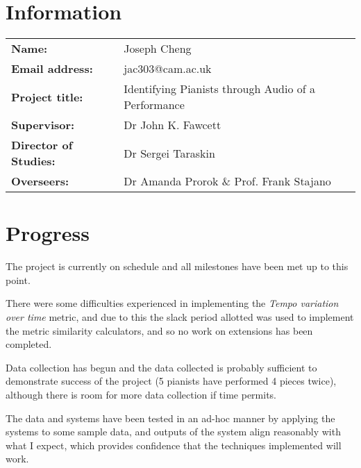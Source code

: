 \documentclass{article}
\begin{document}
\section*{Information}

\begin{tabular}{ll}
    
  \textbf{Name: }&Joseph Cheng \\

  \textbf{Email address: }&jac303@cam.ac.uk \\

  \textbf{Project title: }&Identifying Pianists through Audio of a Performance \\

  \textbf{Supervisor: }&Dr John K. Fawcett \\

  \textbf{Director of Studies: }&Dr Sergei Taraskin \\

  \textbf{Overseers: }&Dr Amanda Prorok \& Prof. Frank Stajano
\end{tabular}

\section*{Progress}

The project is currently on schedule and all milestones have been met up to this point.

There were some difficulties experienced in implementing the \textit{Tempo variation over time} metric, and due to this the slack period allotted was used to implement the metric similarity calculators, and so no work on extensions has been completed.

Data collection has begun and the data collected is probably sufficient to demonstrate success of the project (5 pianists have performed 4 pieces twice), although there is room for more data collection if time permits.

The data and systems have been tested in an ad-hoc manner by applying the systems to some sample data, and outputs of the system align reasonably with what I expect, which provides confidence that the techniques implemented will work.
\end{document}
